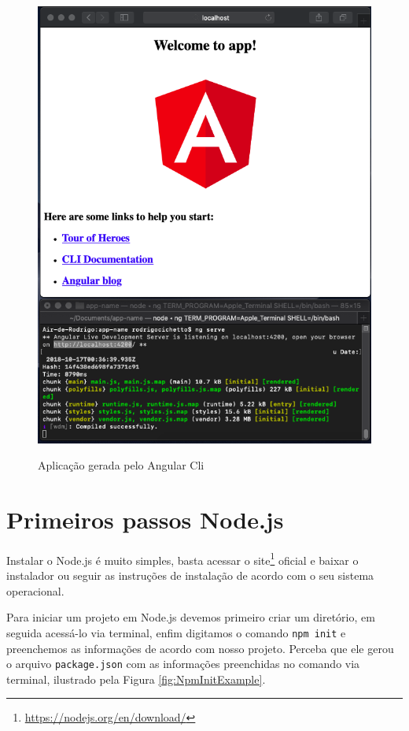\documentclass[
	12pt,				%
	openright,			%
	twoside,			%
	a4paper,			%
	english,			%
	brazil				%
	]{abntex2}
\begin{document}
\begin{anexosenv}
\begin{figure}[h]
	\caption{Aplicação gerada pelo Angular Cli} \label{fig:AngularCliApp}
    \includegraphics[scale=0.4]{angular-cli-app} \\

\end{figure}

\chapter {Primeiros passos Node.js}
\label{anexo:NodePrimeirosPassos}

Instalar o Node.js é muito simples, basta acessar o site\footnote{\url{https://nodejs.org/en/download/}} oficial e baixar o instalador ou seguir as instruções de instalação de acordo com o seu sistema operacional.

Para iniciar um projeto em Node.js devemos primeiro criar um diretório, em seguida acessá-lo via terminal, enfim digitamos o comando \verb|npm init| e preenchemos as informações de acordo com nosso projeto. Perceba que ele gerou o arquivo \verb|package.json| com as informações preenchidas no comando via terminal, ilustrado pela Figura \ref{fig:NpmInitExample}.


\end{anexosenv}
\end{document}
